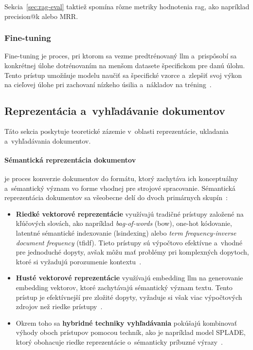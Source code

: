 Sekcia~\ref{sec:rag-eval} taktiež spomína rôzne metriky hodnotenia \gls{rag}, ako napríklad precision@k alebo MRR.

\subsubsection*{Fine-tuning}

Fine-tuning je proces, pri ktorom sa vezme predtrénovaný \gls{llm} a~prispôsobí sa konkrétnej úlohe dotrénovaním na menšom datasete špecifickom pre danú úlohu. Tento prístup umožňuje modelu naučiť sa špecifické vzorce a~zlepšiť svoj výkon na cieľovej úlohe pri zachovaní nízkeho úsilia a~nákladov na tréning~\cite{zhao2023}.

\subsection*{Reprezentácia a~vyhľadávanie dokumentov}

Táto sekcia poskytuje teoretické zázemie v~oblasti reprezentácie, ukladania a~vyhľadávania dokumentov.

\paragraph{Sémantická reprezentácia dokumentov} je proces konverzie dokumentov do formátu, ktorý zachytáva ich konceptuálny a~sémantický význam vo forme vhodnej pre strojové spracovanie. Sémantická reprezentácia dokumentov sa všeobecne delí do dvoch primárnych skupín~\cite{khan2026retrieval}:
\begin{itemize}
    \item \textbf{Riedké vektorové reprezentácie} využívajú tradičné prístupy založené na kľúčových slovách, ako napríklad \emph{bag-of-words} (\gls{bow}), one-hot kódovanie, latentné sémantické indexovanie (\gls{lsindexing}) alebo \emph{term frequency-inverse document frequency} (\gls{tfidf}). Tieto prístupy sú výpočtovo efektívne a~vhodné pre jednoduché dopyty, avšak môžu mať problémy pri komplexných dopytoch, ktoré si vyžadujú porozumenie kontextu~\cite{khan2026retrieval}.

    \item \textbf{Husté vektorové reprezentácie} využívajú embedding \gls{llm} na generovanie embedding vektorov, ktoré zachytávajú sémantický význam textu. Tento prístup je efektívnejší pre zložité dopyty, vyžaduje si však viac výpočtových zdrojov než riedke prístupy~\cite{khan2026retrieval}.

    \item Okrem toho sa \textbf{hybridné techniky vyhľadávania} pokúšajú kombinovať výhody oboch prístupov pomocou techník, ako je napríklad model SPLADE, ktorý obohacuje riedke reprezentácie o~sémanticky príbuzné výrazy~\cite{khan2026retrieval}.
\end{itemize}

